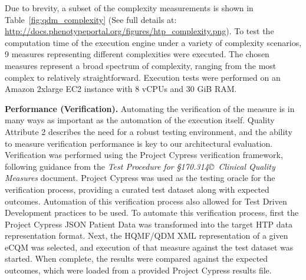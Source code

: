 \documentclass{amia}
\begin{document}
Due to brevity, a subset of the complexity measurements is shown in Table~\ref{fig:qdm_complexity} (See full details at: \url{http://docs.phenotypeportal.org/figures/htp_complexity.png}). To test the computation time of the execution engine under a variety of complexity scenarios, 9 measures representing different complexities were executed. The chosen measures represent a broad spectrum of complexity, ranging from the most complex to relatively straightforward. Execution tests were performed on an Amazon 2xlarge EC2 instance with 8 vCPUs and 30 GiB RAM.


\begin{table}[H]
\end{table}

\textbf{Performance (Verification).}
Automating the verification of the measure is in many ways as important as the automation of the execution itself. Quality Attribute 2 describes the need for a robust testing environment, and the ability to measure verification performance is key to our architectural evaluation.
Verification was performed using the Project Cypress verification framework, following guidance from the \textit{Test Procedure for \S170.314\copyright\ Clinical Quality Measures} document\cite{project_cypress_test_procedures}. Project Cypress was used as the testing oracle for the verification process, providing a curated test dataset along with expected outcomes. Automation of this verification process also allowed for Test Driven Development\cite{janzen2005test} practices to be used.
To automate this verification process, first the Project Cypress JSON Patient Data was transformed into the target HTP data representation format. Next, the HQMF/QDM XML representation of a given eCQM was selected, and execution of that measure against the test dataset was started. When complete, the results were compared against the expected outcomes, which were loaded from a provided Project Cypress results file.%
\end{document}

